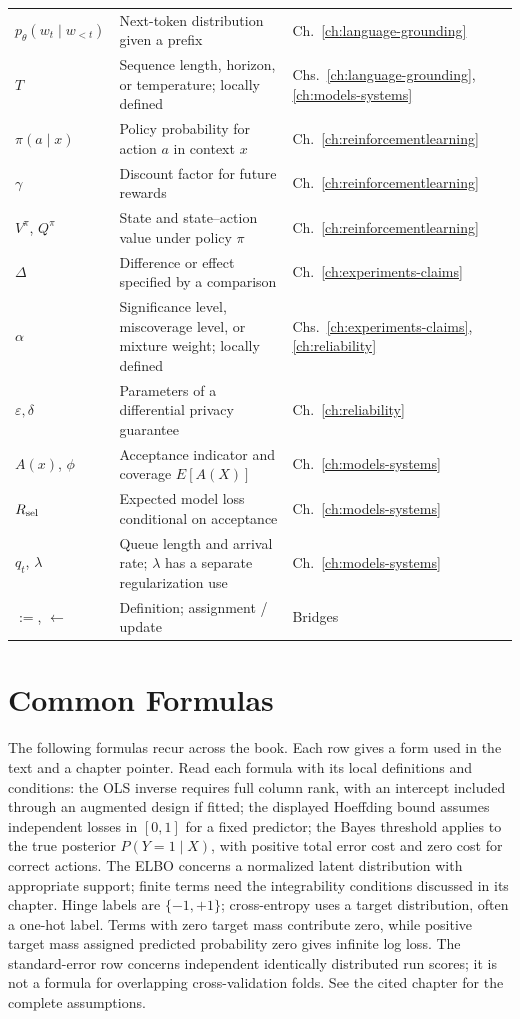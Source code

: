 \begin{longtable}{@{}L{2.0cm}L{5.55cm}L{2.6cm}@{}}
$p_\theta(w_t\mid w_{<t})$ & Next-token distribution given a prefix & Ch.~\ref{ch:language-grounding} \\
$T$ & Sequence length, horizon, or temperature; locally defined & Chs.~\ref{ch:language-grounding}, \ref{ch:models-systems} \\
$\pi(a\mid x)$ & Policy probability for action $a$ in context $x$ & Ch.~\ref{ch:reinforcementlearning} \\
$\gamma$ & Discount factor for future rewards & Ch.~\ref{ch:reinforcementlearning} \\
$V^\pi$, $Q^\pi$ & State and state--action value under policy $\pi$ & Ch.~\ref{ch:reinforcementlearning} \\
$\Delta$ & Difference or effect specified by a comparison & Ch.~\ref{ch:experiments-claims} \\
$\alpha$ & Significance level, miscoverage level, or mixture weight; locally defined & Chs.~\ref{ch:experiments-claims}, \ref{ch:reliability} \\
$\varepsilon,\delta$ & Parameters of a differential privacy guarantee & Ch.~\ref{ch:reliability} \\
$A(x)$, $\phi$ & Acceptance indicator and coverage $E[A(X)]$ & Ch.~\ref{ch:models-systems} \\
$R_{\rm sel}$ & Expected model loss conditional on acceptance & Ch.~\ref{ch:models-systems} \\
$q_t$, $\lambda$ & Queue length and arrival rate; $\lambda$ has a separate regularization use & Ch.~\ref{ch:models-systems} \\

$:=$, $\leftarrow$ & Definition; assignment / update & Bridges \\
\end{longtable}
\endgroup

\section{Common Formulas}

The following formulas recur across the book. Each row gives a form used in the text and a chapter pointer. Read each formula with its local definitions and conditions: the OLS inverse requires full column rank, with an intercept included through an augmented design if fitted; the displayed Hoeffding bound assumes independent losses in $[0,1]$ for a fixed predictor; the Bayes threshold applies to the true posterior $P(Y=1\mid X)$, with positive total error cost and zero cost for correct actions. The ELBO concerns a normalized latent distribution with appropriate support; finite terms need the integrability conditions discussed in its chapter. Hinge labels are $\{-1,+1\}$; cross-entropy uses a target distribution, often a one-hot label. Terms with zero target mass contribute zero, while positive target mass assigned predicted probability zero gives infinite log loss. The standard-error row concerns independent identically distributed run scores; it is not a formula for overlapping cross-validation folds. See the cited chapter for the complete assumptions.

